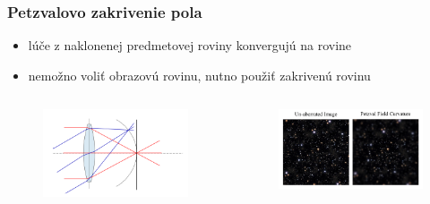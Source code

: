 \documentclass[10pt,xcolor=pdflatex]{beamer}
\begin{document}
\begin{frame}\frametitle{Petzvalovo zakrivenie pola}
    \begin{itemize}
        \item lúče z naklonenej predmetovej roviny konvergujú na rovine 
        \item nemožno voliť obrazovú rovinu, nutno použiť zakrivenú rovinu
    \end{itemize}

    \begin{columns}
        \begin{figure}
            \includegraphics[scale=0.15]{img/fieldcurvature.png}
        \end{figure}
        \begin{figure}
            \includegraphics[scale=0.50]{img/fieldAberration.png}
        \end{figure}
    \end{columns}
\end{frame}
\end{document}
